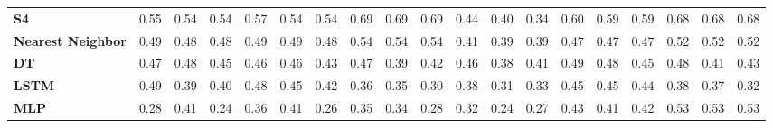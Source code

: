 \begin{table}[t]
{\begin{tabular}{l ccc ccc ccc ccc ccc ccc}
\textbf{S4} & \cellcolor[HTML]{DDD344}0.55 & \cellcolor[HTML]{E2D342}0.54 & \cellcolor[HTML]{E0D343}0.54 & \cellcolor[HTML]{D0D347}0.57 & \cellcolor[HTML]{E1D342}0.54 & \cellcolor[HTML]{E6D341}0.54 & \cellcolor[HTML]{7ED05B}0.69 & \cellcolor[HTML]{7CD05B}0.69 & \cellcolor[HTML]{7ED05B}0.69 & \cellcolor[HTML]{FFBC46}0.44 & \cellcolor[HTML]{FFAB4E}0.40 & \cellcolor[HTML]{FF9359}0.34 & \cellcolor[HTML]{BBD24C}0.60 & \cellcolor[HTML]{C0D24A}0.59 & \cellcolor[HTML]{BFD24B}0.59 & \cellcolor[HTML]{7FD05B}0.68 & \cellcolor[HTML]{84D059}0.68 & \cellcolor[HTML]{83D05A}0.68 \\
\textbf{Nearest Neighbor} & \cellcolor[HTML]{FFD03D}0.49 & \cellcolor[HTML]{FFCC3F}0.48 & \cellcolor[HTML]{FFCD3E}0.48 & \cellcolor[HTML]{FFCE3E}0.49 & \cellcolor[HTML]{FFD23C}0.49 & \cellcolor[HTML]{FFCC3F}0.48 & \cellcolor[HTML]{E1D343}0.54 & \cellcolor[HTML]{E5D341}0.54 & \cellcolor[HTML]{E4D342}0.54 & \cellcolor[HTML]{FFAC4D}0.41 & \cellcolor[HTML]{FFA451}0.39 & \cellcolor[HTML]{FFA550}0.39 & \cellcolor[HTML]{FFC940}0.47 & \cellcolor[HTML]{FFC940}0.47 & \cellcolor[HTML]{FFC841}0.47 & \cellcolor[HTML]{F4D43E}0.52 & \cellcolor[HTML]{F0D43F}0.52 & \cellcolor[HTML]{F3D43E}0.52 \\
\textbf{DT} & \cellcolor[HTML]{FFC542}0.47 & \cellcolor[HTML]{FFCA3F}0.48 & \cellcolor[HTML]{FFBF45}0.45 & \cellcolor[HTML]{FFC144}0.46 & \cellcolor[HTML]{FFC343}0.46 & \cellcolor[HTML]{FFB748}0.43 & \cellcolor[HTML]{FFC940}0.47 & \cellcolor[HTML]{FFA451}0.39 & \cellcolor[HTML]{FFB34A}0.42 & \cellcolor[HTML]{FFC343}0.46 & \cellcolor[HTML]{FFA351}0.38 & \cellcolor[HTML]{FFB04B}0.41 & \cellcolor[HTML]{FFCE3E}0.49 & \cellcolor[HTML]{FFCC3E}0.48 & \cellcolor[HTML]{FFC144}0.45 & \cellcolor[HTML]{FFCC3F}0.48 & \cellcolor[HTML]{FFAF4C}0.41 & \cellcolor[HTML]{FFB748}0.43 \\
\textbf{LSTM} & \cellcolor[HTML]{FFD03D}0.49 & \cellcolor[HTML]{FFA451}0.39 & \cellcolor[HTML]{FFAC4D}0.40 & \cellcolor[HTML]{FFCB3F}0.48 & \cellcolor[HTML]{FFBE45}0.45 & \cellcolor[HTML]{FFB14B}0.42 & \cellcolor[HTML]{FF9B55}0.36 & \cellcolor[HTML]{FF9657}0.35 & \cellcolor[HTML]{FF7E62}0.30 & \cellcolor[HTML]{FFA352}0.38 & \cellcolor[HTML]{FF845F}0.31 & \cellcolor[HTML]{FF8D5B}0.33 & \cellcolor[HTML]{FFBE45}0.45 & \cellcolor[HTML]{FFBD45}0.45 & \cellcolor[HTML]{FFBD46}0.44 & \cellcolor[HTML]{FFA252}0.38 & \cellcolor[HTML]{FF9D54}0.37 & \cellcolor[HTML]{FF875E}0.32 \\
\textbf{MLP} & \cellcolor[HTML]{FF7766}0.28 & \cellcolor[HTML]{FFAE4C}0.41 & \cellcolor[HTML]{FF6B6B}0.24 & \cellcolor[HTML]{FF9856}0.36 & \cellcolor[HTML]{FFAD4D}0.41 & \cellcolor[HTML]{FF7069}0.26 & \cellcolor[HTML]{FF9657}0.35 & \cellcolor[HTML]{FF8F5B}0.34 & \cellcolor[HTML]{FF7766}0.28 & \cellcolor[HTML]{FF895D}0.32 & \cellcolor[HTML]{FF6B6B}0.24 & \cellcolor[HTML]{FF7367}0.27 & \cellcolor[HTML]{FFB748}0.43 & \cellcolor[HTML]{FFB04B}0.41 & \cellcolor[HTML]{FFB14B}0.42 & \cellcolor[HTML]{E9D340}0.53 & \cellcolor[HTML]{E9D340}0.53 & \cellcolor[HTML]{ECD340}0.53 \\

\end{tabular}}
\end{table}

